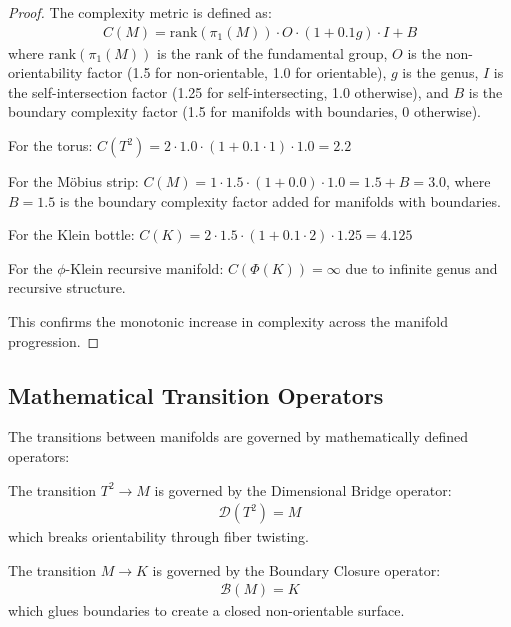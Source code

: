 \begin{proof}
The complexity metric is defined as:
\begin{align}
C(M) = \text{rank}(\pi_1(M)) \cdot O \cdot (1 + 0.1g) \cdot I + B
\end{align}
where $\text{rank}(\pi_1(M))$ is the rank of the fundamental group, $O$ is the non-orientability factor (1.5 for non-orientable, 1.0 for orientable), $g$ is the genus, $I$ is the self-intersection factor (1.25 for self-intersecting, 1.0 otherwise), and $B$ is the boundary complexity factor (1.5 for manifolds with boundaries, 0 otherwise).

For the torus: $C(T^2) = 2 \cdot 1.0 \cdot (1 + 0.1 \cdot 1) \cdot 1.0 = 2.2$

For the Möbius strip: $C(M) = 1 \cdot 1.5 \cdot (1 + 0.0) \cdot 1.0 = 1.5 + B = 3.0$, where $B = 1.5$ is the boundary complexity factor added for manifolds with boundaries.

For the Klein bottle: $C(K) = 2 \cdot 1.5 \cdot (1 + 0.1 \cdot 2) \cdot 1.25 = 4.125$

For the $\phi$-Klein recursive manifold: $C(\Phi(K)) = \infty$ due to infinite genus and recursive structure.

This confirms the monotonic increase in complexity across the manifold progression.
\end{proof}

\subsection{Mathematical Transition Operators}

The transitions between manifolds are governed by mathematically defined operators:

\begin{definition}
The transition $T^2 \rightarrow M$ is governed by the Dimensional Bridge operator:
\begin{align}
\mathcal{D}(T^2) = M
\end{align}
which breaks orientability through fiber twisting.
\end{definition}

\begin{definition}
The transition $M \rightarrow K$ is governed by the Boundary Closure operator:
\begin{align}
\mathcal{B}(M) = K
\end{align}
which glues boundaries to create a closed non-orientable surface.
\end{definition}


